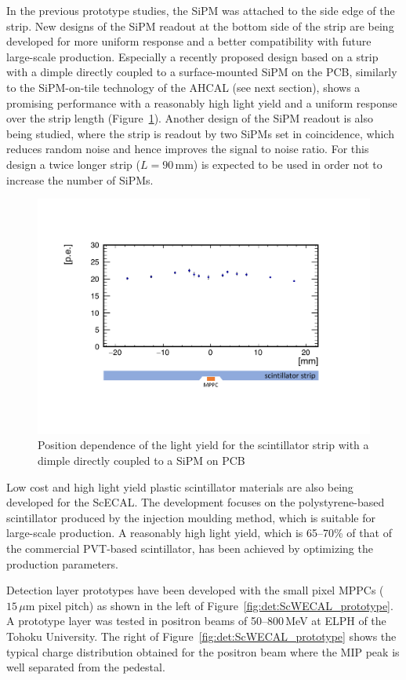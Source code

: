 In the previous prototype studies, the SiPM was attached to the side edge 
of the strip. 
New designs of the SiPM readout at the bottom side of the strip 
are being developed for more uniform response and a better compatibility 
with future large-scale production.
Especially a recently proposed design based on a strip 
with a dimple directly coupled to a surface-mounted SiPM on the PCB, similarly to the SiPM-on-tile technology of the AHCAL (see next section),
shows a promising performance with a reasonably high light yield and a uniform response 
over the strip length (Figure~\ref{fig:det:ScWECAL_strip}).
Another design of the SiPM readout is also being studied, where the strip 
is readout by two SiPMs set in coincidence, which reduces random noise and hence improves the signal to noise ratio. For this design a twice longer strip ($L=90\,\mathrm{mm}$) is expected to be used in order
not to increase the number of SiPMs.

\begin{figure}[htb]
\centering
\includegraphics[width=0.7\hsize]{Detector/fig/ScWECAL_strip.pdf}
\caption{Position dependence of the light yield for the scintillator 
strip with a dimple directly coupled to a SiPM on PCB}
\label{fig:det:ScWECAL_strip}
\end{figure}


Low cost and high light yield plastic scintillator materials are also being developed 
for the ScECAL.
The development focuses on the polystyrene-based scintillator 
produced by the injection moulding method, which is suitable 
for large-scale production. 
A reasonably high light yield, which is 65--70\% of that of 
the commercial PVT-based scintillator, has been achieved 
by optimizing the production parameters. 

Detection layer prototypes have been developed 
with the small pixel MPPCs ($15\,\mu\mathrm{m}$ pixel pitch) 
as shown in the left of Figure~\ref{fig:det:ScWECAL_prototype}.
A prototype layer was tested in positron beams of 50--800\,MeV 
at ELPH of the Tohoku University.
The right of Figure~\ref{fig:det:ScWECAL_prototype} shows the typical charge distribution 
obtained for the positron beam where the MIP peak is well separated 
from the pedestal.

